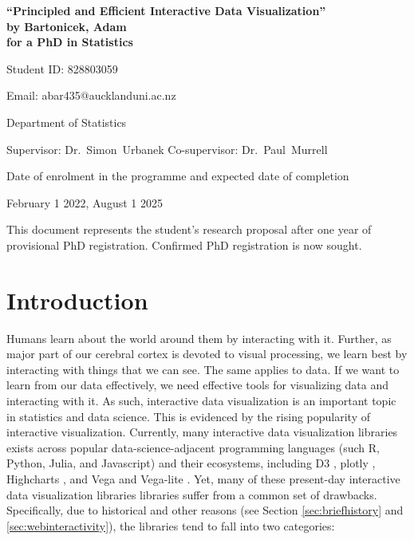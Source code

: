 \documentclass[12pt,a4paper]{article}
\begin{document}
\begin{Large}
\begin{center}
\textbf{``Principled and Efficient Interactive Data Visualization''} \\
\textbf{by Bartonicek, Adam} \\
\textbf{for a PhD in Statistics}
\end{center}
\end{Large}


\hfill{Student ID: 828803059}

\hfill{Email: abar435@aucklanduni.ac.nz}

\hfill{Department of Statistics}

Supervisor: Dr.~Simon~Urbanek
Co-supervisor: Dr.~Paul~Murrell


\begin{center}
Date of enrolment in the programme and expected date of completion
\end{center}

\begin{center}
February 1 2022, August 1 2025
\end{center}



This document represents the student's research proposal after
one year of provisional PhD registration.
Confirmed PhD registration is now sought.


\section{Introduction}
\label{sec:intro}



Humans learn about the world around them by interacting with it. Further, as major part of our cerebral cortex is devoted to visual processing, we learn best by interacting with things that we can see. The same applies to data. If we want to learn from our data effectively, we need effective tools for visualizing data and interacting with it. As such, interactive data visualization is an important topic in statistics and data science. This is evidenced by the rising popularity of interactive visualization. Currently, many interactive data visualization libraries exists across popular data-science-adjacent programming languages (such R, Python, Julia, and Javascript) and their ecosystems, including D3 \citep{bostock2011}, plotly \citep{plotly2023}, Highcharts \citep{highcharts2023}, and Vega \citep{satyanarayan2015} and Vega-lite \citep{satyanarayan2016}. Yet, many of these present-day interactive data visualization libraries libraries suffer from a common set of drawbacks. Specifically, due to historical and other reasons (see Section \ref{sec:briefhistory} and \ref{sec:webinteractivity}), the libraries tend to fall into two categories: 
\end{document}
